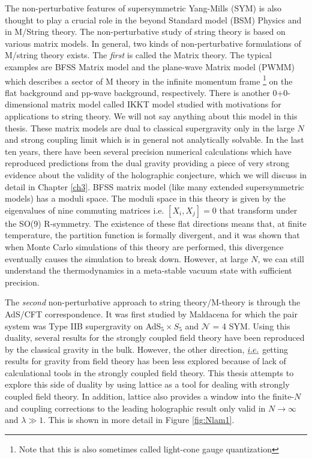 The non-perturbative features of supersymmetric Yang-Mills (SYM) is also 
thought to play a crucial role in the beyond 
Standard model (BSM) Physics and in M/String theory. 
The non-perturbative study of string theory is based on various matrix models. 
In general, two kinds of non-perturbative formulations of M/string theory exists. 
The \textit{first} is called the Matrix theory. The typical examples are BFSS Matrix model and the
plane-wave Matrix model (PWMM) which describes a sector
of M theory in the infinite momentum frame \footnote{Note that this is
also sometimes called light-cone gauge quantization} on the flat
background and pp-wave background, respectively. There is another 
0+0-dimensional matrix model called IKKT model \cite{Ishibashi:1996xs}
studied with motivations for applications to string theory. We will not say anything about this 
model in this thesis. These matrix models are dual to classical supergravity only in the large $N$ 
and strong coupling limit which is in general not analytically solvable. In the last ten years, there have 
been several precision numerical calculations which have reproduced predictions from the dual gravity 
providing a piece of very strong evidence about the validity of the holographic conjecture, 
which we will discuss in detail in Chapter \ref{ch3}. BFSS matrix model 
(like many extended supersymmetric models) has a moduli space. 
The moduli space in this theory is given by the eigenvalues of nine commuting matrices i.e. 
$ [X_{i}, X_{j}] = 0 $ that transform under the SO(9) R-symmetry. 
The existence of these flat directions means that, at finite temperature,
the partition function is formally divergent, and it was shown that when Monte
Carlo simulations of this theory are performed, this divergence eventually causes the
simulation to break down. However, at large $N$, we can still understand the
thermodynamics in a meta-stable vacuum state with sufficient precision. 

The \textit{second} non-perturbative approach to string theory/M-theory 
is through the AdS/CFT correspondence. It was first studied by Maldacena for which the pair system was 
Type IIB supergravity on AdS$_5 \times S_5$ and $\mathcal{N}$ = 4 SYM.
Using this duality, several results for the strongly coupled field theory have been reproduced by the classical 
gravity in the bulk. However, the other direction, $\emph{i.e.}$
getting results for gravity from field theory has been less explored because of lack of calculational tools in 
the strongly coupled field theory. This thesis attempts to explore this side of duality by using lattice as a tool for 
dealing with strongly coupled field theory. 
In addition, lattice also provides a window into the finite-$N$ and coupling corrections to the leading holographic 
result only valid in $N \to \infty$ and $\lambda \gg 1$. This is shown in more detail in Figure \ref{fig:Nlam1}. 


